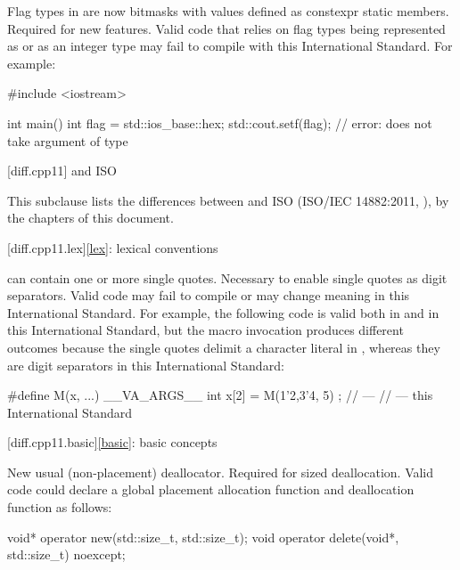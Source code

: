 \change Flag types in  are now bitmasks with values
defined as constexpr static members.
\rationale Required for new features.
\effect
Valid \CppIII{} code that relies on  flag types being
represented as  or as an integer type may fail to compile
with this International Standard. For example:

\begin{codeblock}
#include <iostream>

int main() {
  int flag = std::ios_base::hex;
  std::cout.setf(flag);         // error:  does not take argument of type 
}
\end{codeblock}

[diff.cpp11]{\Cpp{} and ISO \CppXI{}}

\pnum
{}%
This subclause lists the differences between \Cpp{} and
ISO \CppXI{} (ISO/IEC 14882:2011, ),
by the chapters of this document.

[diff.cpp11.lex]{\ref{lex}: lexical conventions}

\change {} can contain one or more single quotes.
\rationale Necessary to enable single quotes as digit separators.
\effect Valid \CppXI{} code may fail to compile or may change meaning in this
International Standard. For example, the following code is valid both in \CppXI{} and in
this International Standard, but the macro invocation produces different outcomes
because the single quotes delimit a character literal in \CppXI{}, whereas they are digit
separators in this International Standard:

\begin{codeblock}
#define M(x, ...) __VA_ARGS__
int x[2] = { M(1'2,3'4, 5) };
//  --- \CppXI{}
//  --- this International Standard
\end{codeblock}

[diff.cpp11.basic]{\ref{basic}: basic concepts}

\change New usual (non-placement) deallocator.
\rationale Required for sized deallocation.
\effect Valid \CppXI{} code could declare a global placement allocation function and
deallocation function as follows:

\begin{codeblock}
void* operator new(std::size_t, std::size_t);
void operator delete(void*, std::size_t) noexcept;
\end{codeblock}

